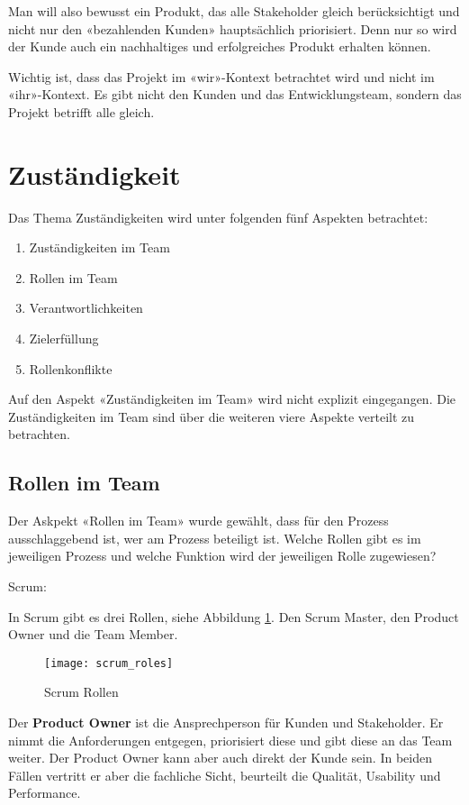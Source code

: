 Man will also bewusst ein Produkt, das alle Stakeholder gleich berücksichtigt und nicht nur den «bezahlenden Kunden» hauptsächlich priorisiert. Denn nur so wird der Kunde auch ein nachhaltiges und erfolgreiches Produkt erhalten können.

Wichtig ist, dass das Projekt im «wir»-Kontext betrachtet wird und nicht im «ihr»-Kontext. Es gibt nicht den Kunden und das Entwicklungsteam, sondern das Projekt betrifft alle gleich.

\pagebreak
\section{Zuständigkeit}

Das Thema Zuständigkeiten wird unter folgenden fünf Aspekten betrachtet:
\begin{enumerate}
\item Zuständigkeiten im Team
\item Rollen im Team
\item Verantwortlichkeiten
\item Zielerfüllung
\item Rollenkonflikte
\end{enumerate}

Auf den Aspekt «Zuständigkeiten im Team» wird nicht explizit eingegangen. Die Zuständigkeiten im Team sind über die weiteren viere Aspekte verteilt zu betrachten.

\subsection{Rollen im Team}\label{rollen}

Der Askpekt «Rollen im Team» wurde gewählt, dass für den Prozess ausschlaggebend ist, wer am Prozess beteiligt ist. Welche Rollen gibt es im jeweiligen Prozess und welche Funktion wird der jeweiligen Rolle zugewiesen?

{\Large Scrum:} \cite{scrumRoles} \medskip

In Scrum gibt es drei Rollen, siehe Abbildung \ref{fig:scrumrollen}. Den Scrum Master, den Product Owner und die Team Member. 
\begin{figure}[H]
	\centering
	\texttt{[image: scrum\_roles]}
	\caption{Scrum Rollen \cite{scrumRoles}}
	\label{fig:scrumrollen}
\end{figure}

Der \textbf{Product Owner} ist die Ansprechperson für Kunden und Stakeholder. Er nimmt die Anforderungen entgegen, priorisiert diese und gibt diese an das Team weiter. Der Product Owner kann aber auch direkt der Kunde sein. In beiden Fällen vertritt er aber die fachliche Sicht, beurteilt die Qualität, Usability und Performance. \medskip


